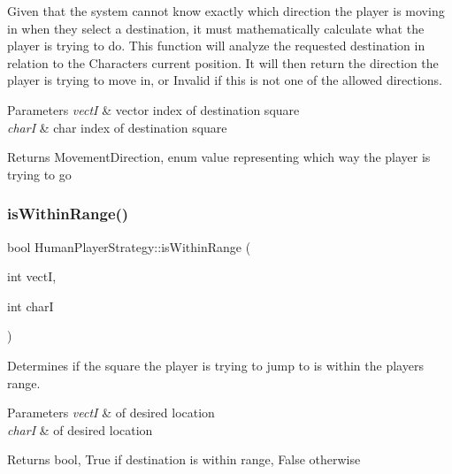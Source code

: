 Given that the system cannot know exactly which direction the player is moving in when they select a destination, it must mathematically calculate what the player is trying to do. This function will analyze the requested destination in relation to the Character\textquotesingle{}s current position. It will then return the direction the player is trying to move in, or \textquotesingle{}Invalid\textquotesingle{} if this is not one of the allowed directions. 
\begin{DoxyParams}{Parameters}
{\em vectI} & vector index of destination square \\
\hline
{\em charI} & char index of destination square \\
\hline
\end{DoxyParams}
\begin{DoxyReturn}{Returns}
Movement\+Direction, enum value representing which way the player is trying to go 
\end{DoxyReturn}
\hypertarget{class_human_player_strategy_ab5648cac493c1f34a7e48b3e98dbf0fc}{}\label{class_human_player_strategy_ab5648cac493c1f34a7e48b3e98dbf0fc} 
\subsubsection{\texorpdfstring{is\+Within\+Range()}{isWithinRange()}}
{\footnotesize\ttfamily bool Human\+Player\+Strategy\+::is\+Within\+Range (\begin{DoxyParamCaption}\item[{int}]{vectI,  }\item[{int}]{charI }\end{DoxyParamCaption})\hspace{0.3cm}{\ttfamily [virtual]}}

Determines if the square the player is trying to jump to is within the player\textquotesingle{}s range. 
\begin{DoxyParams}{Parameters}
{\em vectI} & of desired location \\
\hline
{\em charI} & of desired location \\
\hline
\end{DoxyParams}
\begin{DoxyReturn}{Returns}
bool, True if destination is within range, False otherwise 
\end{DoxyReturn}


